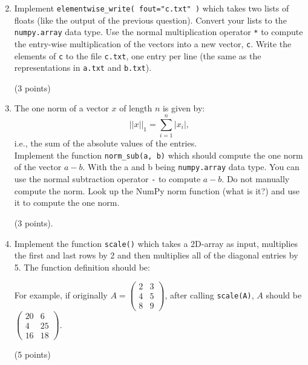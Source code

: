 \documentclass{article}
\newcommand{\ssum}[3]{\displaystyle\sum\limits_{#1}^{#2} #3}
\newcounter{points}
\newcommand\setpoints[1]{\addtocounter{points}{#1}(#1 points)}
\begin{document}
\begin{enumerate}
\begin{enumerate}
\setcounter{enumii}{1}
\item Implement \texttt{elementwise\_write( fout="c.txt" )} which takes two lists of floats (like the output of the previous question). Convert your lists to the \texttt{numpy.array} data type.  Use the normal multiplication operator \texttt{*} to compute the entry-wise multiplication of the vectors into a new vector, \texttt{c}.  Write the elements of \texttt{c} to the file \texttt{c.txt}, one entry per line (the same as the representations in \texttt{a.txt} and \texttt{b.txt}). \setpoints{3} \\

\end{enumerate}

\begin{enumerate}
\setcounter{enumii}{2}
\item The one norm of a vector $x$ of length $n$ is given by:
\[
||x||_1 = \ssum{i=1}{n}{|x_i|},
\]
 i.e., the sum of the absolute values of the entries. \\

Implement the function \texttt{norm\_sub(a, b)} which should compute the one norm of the vector $a - b$.  With the a and b being \texttt{numpy.array} data type. You can use the normal subtraction operator \texttt{-} to compute $a - b$.  Do not manually compute the norm.  Look up the NumPy norm function (what is it?) and use it to compute the one norm. \setpoints{3}.
\end{enumerate}

\begin{enumerate}
\setcounter{enumii}{3}
\item Implement the function \texttt{scale()} which takes a 2D-array as input, multiplies the first and last rows by 2 and then multiplies all of the diagonal entries by 5.  The function definition should be:

For example, if originally $A = \begin{pmatrix} 2 & 3 \\ 4 & 5 \\ 8 & 9 \end{pmatrix}$, after calling \texttt{scale(A)}, $A$ should be $\begin{pmatrix} 20 & 6 \\ 4 & 25 \\ 16 & 18 \end{pmatrix}$.
\\  \setpoints{5}


\end{enumerate}
\end{enumerate}
\end{document}
